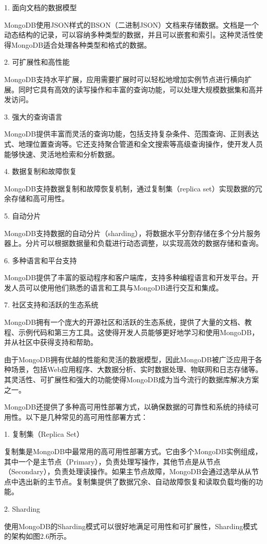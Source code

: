 1. 面向文档的数据模型

MongoDB使用JSON样式的BSON（二进制JSON）文档来存储数据。文档是一个动态结构的记录，可以容纳多种类型的数据，并且可以嵌套和索引。这种灵活性使得MongoDB适合处理各种类型和格式的数据。

2. 可扩展性和高性能

MongoDB支持水平扩展，应用需要扩展时可以轻松地增加实例节点进行横向扩展。同时它具有高效的读写操作和丰富的查询功能，可以处理大规模数据集和高并发访问。

3. 强大的查询语言

MongoDB提供丰富而灵活的查询功能，包括支持复杂条件、范围查询、正则表达式、地理位置查询等。它还支持聚合管道和全文搜索等高级查询操作，使开发人员能够快速、灵活地检索和分析数据。

4. 数据复制和故障恢复

MongoDB支持数据复制和故障恢复机制，通过复制集（replica set）实现数据的冗余存储和高可用性。

5. 自动分片

MongoDB支持数据的自动分片（sharding），将数据水平分割存储在多个分片服务器上。分片可以根据数据量和负载进行动态调整，以实现高效的数据存储和查询。

6. 多种语言和平台支持

MongoDB提供了丰富的驱动程序和客户端库，支持多种编程语言和开发平台。开发人员可以使用他们熟悉的语言和工具与MongoDB进行交互和集成。

7. 社区支持和活跃的生态系统

MongoDB拥有一个庞大的开源社区和活跃的生态系统，提供了大量的文档、教程、示例代码和第三方工具。这使得开发人员能够更好地学习和使用MongoDB，并从社区中获得支持和帮助。

由于MongoDB拥有优越的性能和灵活的数据模型，因此MongoDB被广泛应用于各种场景，包括Web应用程序、大数据分析、实时数据处理、物联网和日志存储等。其灵活性、可扩展性和强大的功能使得MongoDB成为当今流行的数据库解决方案之一。

MongoDB还提供了多种高可用性部署方式，以确保数据的可靠性和系统的持续可用性。以下是几种常见的高可用性部署方式：

1. 复制集（Replica Set）

复制集是MongoDB中最常用的高可用性部署方式。它由多个MongoDB实例组成，其中一个是主节点（Primary），负责处理写操作，其他节点是从节点（Secondary），负责处理读操作。如果主节点故障，MongoDB会通过选举从从节点中选出新的主节点。复制集提供了数据冗余、自动故障恢复和读取负载均衡的功能。

2. Sharding

使用MongoDB的Sharding模式可以很好地满足可用性和可扩展性，Sharding模式的架构如图2.6所示。

